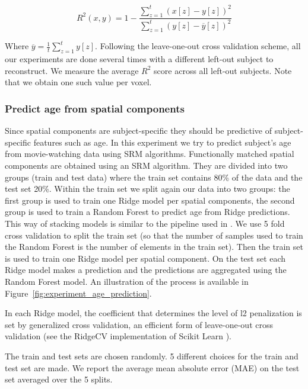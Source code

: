 \[
	R^2(x, y) = 1 - \frac{\sum_{z=1}^t (x[z] - y[z])^2}{\sum_{z=1}^t (y[z] - \overline{y}[z])^2} 
\]

Where $\overline{y} = \frac{1}{t}\sum_{z=1}^t y[z]$.
%
Following the leave-one-out cross validation scheme, all our experiments are done several times with a different left-out subject to reconstruct. 
%
We measure the average $R^2$ score across  all left-out subjects. Note that we obtain one such value per voxel.

\subsubsection{Predict age from spatial components}
Since spatial components are subject-specific they should be predictive of subject-specific features such as age.
%
In this experiment we try to predict subject's age from movie-watching data using SRM algorithms.
%
Functionally matched spatial components are obtained using an SRM algorithm.
%
They are divided into two groups (train and test data) where the train set contains 80\% of the data and the test set 20\%.
%
Within the train set we split again our data into two groups: the first group is used to train one Ridge model per spatial components, the second group is used to train a Random Forest to predict age from Ridge predictions. This way of stacking models is similar to the pipeline used in \cite{rahim2017joint}.
%
We use 5 fold cross validation to split the train set (so that the number of samples used to train the Random Forest is the number of elements in the train set).
%
Then the train set is used to train one Ridge model per spatial component.
%
On the test set each Ridge model makes a prediction and the predictions are aggregated using the Random Forest model.
%
An illustration of the process is available in Figure~\ref{fig:experiment_age_prediction}. 

In each Ridge model, the coefficient that determines the level of l2 penalization is set by generalized cross validation, an efficient form of leave-one-out cross validation (see the RidgeCV implementation of Scikit Learn \cite{pedregosa2011scikit}).

The train and test sets are chosen randomly. 5 different choices for the train and test set are made. We report the average mean absolute error (MAE) on the test set averaged over the 5 splits.

